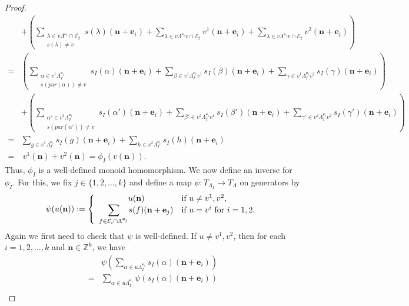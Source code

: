 \documentclass[12pt]{amsart}
\newcommand{\N}{\mathbf{n}}
\theoremstyle{definition}
\theoremstyle{remark}
\begin{document}
\begin{proof}
{\begin{align*}
&+\left(\displaystyle{\sum_{\substack{\lambda\in v\Lambda^{\mathbf{e}_i}\cap \mathcal{E}_2\\s(\lambda)\neq v}}} s(\lambda)(\N+\mathbf{e}_i)+\displaystyle{\sum_{\lambda\in v\Lambda^{\mathbf{e}_i}v \cap \mathcal{E}_2}}v^1(\N+\mathbf{e}_i)+\displaystyle{\sum_{\lambda\in v\Lambda^{\mathbf{e}_i}v \cap \mathcal{E}_2}}v^2(\N+\mathbf{e}_i)\right)\\
=& \left(\displaystyle{\sum_{\substack{\alpha\in v^1\Lambda_I^{\mathbf{e}_i}\\s(par(\alpha))\neq v}}} s_I(\alpha)(\N+\mathbf{e}_i)+\displaystyle{\sum_{\beta\in v^1\Lambda_I^{\mathbf{e}_i}v^1}} s_I(\beta)(\N+\mathbf{e}_i)+\displaystyle{\sum_{\gamma\in v^1\Lambda_I^{\mathbf{e}_i}v^2}} s_I(\gamma)(\N+\mathbf{e}_i)\right)\\
&+\left(\displaystyle{\sum_{\substack{\alpha'\in v^2\Lambda_I^{\mathbf{e}_i}\\s(par(\alpha'))\neq v}}} s_I(\alpha')(\N+\mathbf{e}_i)+\displaystyle{\sum_{\beta'\in v^2\Lambda_I^{\mathbf{e}_i}v^1}} s_I(\beta')(\N+\mathbf{e}_i)+\displaystyle{\sum_{\gamma'\in v^2\Lambda_I^{\mathbf{e}_i}v^2}} s_I(\gamma')(\N+\mathbf{e}_i)\right)\\
=& \displaystyle{\sum_{g\in v^1\Lambda_I^{\mathbf{e}_i}}} s_I(g)(\N+\mathbf{e}_i)+\displaystyle{\sum_{h\in v^2\Lambda_I^{\mathbf{e}_i}}} s_I(h)(\N+\mathbf{e}_i)\\
=&~ v^1(\N)+v^2(\N)=\phi_I(v(\N)).
\end{align*}
} 
Thus, $\phi_I$ is a well-defined monoid homomorphism. We now define an inverse for $\phi_I$. For this, we fix $j\in \{1,2,\ldots,k\}$ and define a map $\psi:T_{\Lambda_I}\longrightarrow T_\Lambda$ on generators by 
$$\psi(u(\N)):=
	\left\{
	\begin{array}{ll}
		\hspace{1.25cm} u(\N)  & \mbox{if } u\neq v^1,v^2, \\
		\displaystyle{\sum_{f\in \mathcal{E}_i\cap \Lambda^{\mathbf{e}_j}}} s(f)(\N+\mathbf{e}_j)  & \mbox{if } u=v^i~\mbox{for}~i=1,2.
	\end{array}
	\right.$$ 
Again we first need to check that $\psi$ is well-defined. If $u\neq v^1,v^2$, then for each $i=1,2,\ldots,k$ and $\N\in \mathbb{Z}^k$, we have 
{\allowdisplaybreaks
\begin{align*}
&\psi\left(\displaystyle{\sum_{\alpha\in u\Lambda_I^{\mathbf{e}_i}}} s_I(\alpha)(\N+\mathbf{e}_i)\right)\\
=& \displaystyle{\sum_{\alpha\in u\Lambda_I^{\mathbf{e}_i}}} \psi(s_I(\alpha)(\N+\mathbf{e}_i))\\

\end{align*}}
\end{proof}
\end{document}
